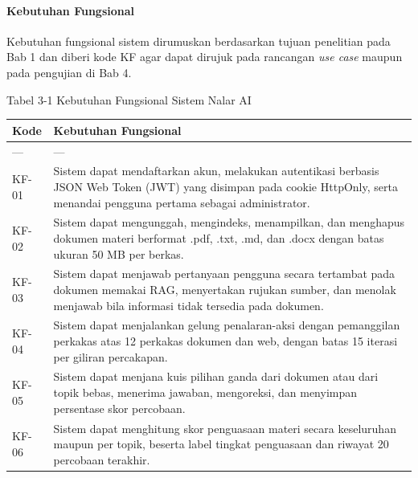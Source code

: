 \documentclass[12pt,a4paper]{article}
\begin{document}
\paragraph*{Kebutuhan Fungsional}

Kebutuhan fungsional sistem dirumuskan berdasarkan tujuan penelitian pada Bab 1 dan diberi kode KF agar dapat dirujuk pada rancangan \textit{use case} maupun pada pengujian di Bab 4.



Tabel 3-1	Kebutuhan Fungsional Sistem Nalar AI



\begin{table}[h]

\centering

\begin{tabular}{ll}

\toprule

Kode & Kebutuhan Fungsional \\

\midrule

--- & --- \\

KF-01 & Sistem dapat mendaftarkan akun, melakukan autentikasi berbasis JSON Web Token (JWT) yang disimpan pada cookie HttpOnly, serta menandai pengguna pertama sebagai administrator. \\

KF-02 & Sistem dapat mengunggah, mengindeks, menampilkan, dan menghapus dokumen materi berformat .pdf, .txt, .md, dan .docx dengan batas ukuran 50 MB per berkas. \\

KF-03 & Sistem dapat menjawab pertanyaan pengguna secara tertambat pada dokumen memakai RAG, menyertakan rujukan sumber, dan menolak menjawab bila informasi tidak tersedia pada dokumen. \\

KF-04 & Sistem dapat menjalankan gelung penalaran-aksi dengan pemanggilan perkakas atas 12 perkakas dokumen dan web, dengan batas 15 iterasi per giliran percakapan. \\

KF-05 & Sistem dapat menjana kuis pilihan ganda dari dokumen atau dari topik bebas, menerima jawaban, mengoreksi, dan menyimpan persentase skor percobaan. \\

KF-06 & Sistem dapat menghitung skor penguasaan materi secara keseluruhan maupun per topik, beserta label tingkat penguasaan dan riwayat 20 percobaan terakhir. \\


\end{tabular}
\end{table}
\end{document}
